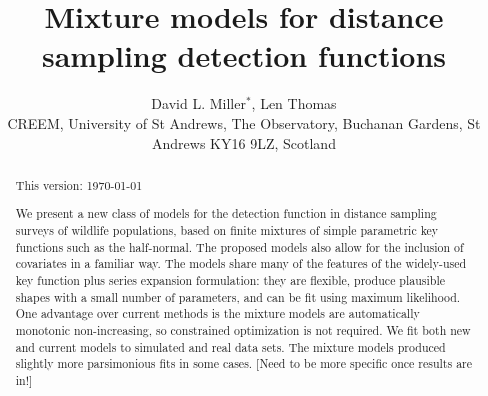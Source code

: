 \documentclass[useAMS,referee, usegraphicx]{biom}
\title[Mixture model detection functions]{Mixture models for distance sampling detection functions}
\author{David L. Miller$^{*}$\email{dave@ninepointeightone.net}, 
Len Thomas\\
CREEM, University of St Andrews, The Observatory, Buchanan Gardens, St Andrews KY16 9LZ, Scotland}
\begin{document}








\label{firstpage}


\begin{abstract}
This version: \today %


We present a new class of models for the detection function in distance sampling surveys of wildlife populations, based on finite mixtures of simple parametric key functions such as the half-normal. The proposed models also allow for the inclusion of covariates in a familiar way. The models share many of the features of the widely-used key function plus series expansion formulation: they are flexible, produce plausible shapes with a small number of parameters, and can be fit using maximum likelihood. One advantage over current methods is the mixture models are automatically monotonic non-increasing, so constrained optimization is not required. We fit both new and current models to simulated and real data sets.  The mixture models produced slightly more parsimonious fits in some cases. [Need to be more specific once results are in!]
\end{abstract}
\end{document}
